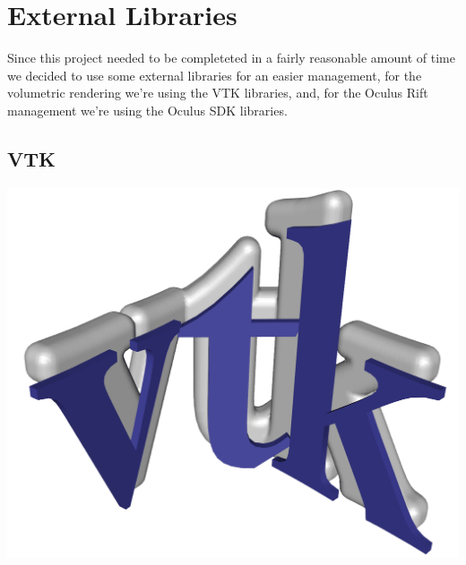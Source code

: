 \documentclass[11pt]{article} %
\begin{document}

\newpage
\section{External Libraries}
Since this project needed to be completeted in a fairly reasonable amount of time we decided to use some external libraries for an easier management, for the volumetric rendering we're using the VTK libraries, and, for the Oculus Rift management we're using the Oculus SDK libraries.

\subsection{VTK}
\includegraphics[width=0.2\linewidth]{VTK.png}
\end{document}
